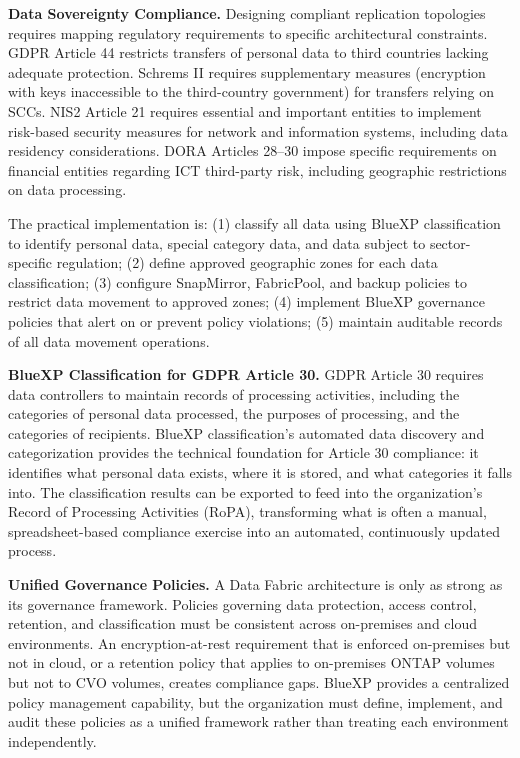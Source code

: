 \begin{securitybox}
\textbf{Data Sovereignty Compliance.}
Designing compliant replication topologies requires mapping regulatory requirements to specific architectural constraints. GDPR Article 44 restricts transfers of personal data to third countries lacking adequate protection. Schrems II requires supplementary measures (encryption with keys inaccessible to the third-country government) for transfers relying on SCCs. NIS2 Article 21 requires essential and important entities to implement risk-based security measures for network and information systems, including data residency considerations. DORA Articles 28--30 impose specific requirements on financial entities regarding ICT third-party risk, including geographic restrictions on data processing.

The practical implementation is: (1) classify all data using BlueXP classification to identify personal data, special category data, and data subject to sector-specific regulation; (2) define approved geographic zones for each data classification; (3) configure SnapMirror, FabricPool, and backup policies to restrict data movement to approved zones; (4) implement BlueXP governance policies that alert on or prevent policy violations; (5) maintain auditable records of all data movement operations.

\textbf{BlueXP Classification for GDPR Article 30.}
GDPR Article 30 requires data controllers to maintain records of processing activities, including the categories of personal data processed, the purposes of processing, and the categories of recipients. BlueXP classification's automated data discovery and categorization provides the technical foundation for Article 30 compliance: it identifies what personal data exists, where it is stored, and what categories it falls into. The classification results can be exported to feed into the organization's Record of Processing Activities (RoPA), transforming what is often a manual, spreadsheet-based compliance exercise into an automated, continuously updated process.

\textbf{Unified Governance Policies.}
A Data Fabric architecture is only as strong as its governance framework. Policies governing data protection, access control, retention, and classification must be consistent across on-premises and cloud environments. An encryption-at-rest requirement that is enforced on-premises but not in cloud, or a retention policy that applies to on-premises ONTAP volumes but not to CVO volumes, creates compliance gaps. BlueXP provides a centralized policy management capability, but the organization must define, implement, and audit these policies as a unified framework rather than treating each environment independently.


\end{securitybox}
